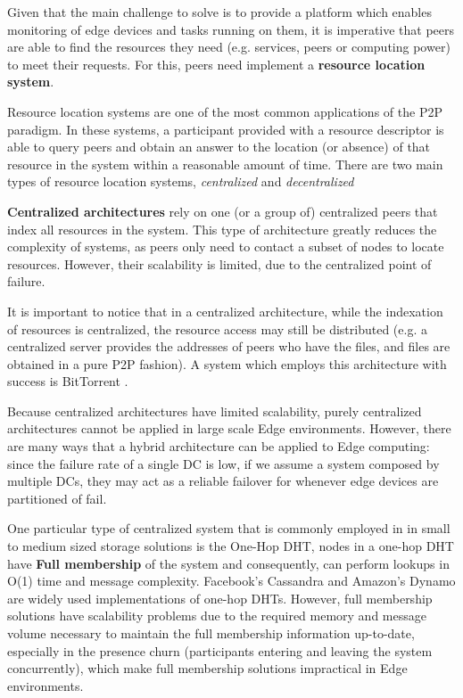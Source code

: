 

Given that the main challenge to solve is to provide a platform which enables monitoring of edge devices and tasks running on them, it is imperative that peers are able to find the resources they need (e.g. services, peers or computing power) to meet their requests. For this, peers need implement a \textbf{resource location system}.

Resource location systems are one of the most common applications of the P2P paradigm. In these systems, a participant provided with a resource descriptor is able to query peers and obtain an answer to the location (or absence) of that resource in the system within a reasonable amount of time. There are two main types of resource location systems, \textit{centralized} and \textit{decentralized}

\textbf{Centralized architectures} rely on one (or a group of) centralized peers that index all resources in the system. This type of architecture greatly reduces the complexity of systems, as peers only need to contact a subset of nodes to locate resources. However, their scalability is limited, due to the centralized point of failure. 

It is important to notice that in a centralized architecture, while the indexation of resources is centralized, the resource access may still be distributed (e.g. a centralized server provides the addresses of peers who have the files, and files are obtained in a pure P2P fashion). A system which employs this architecture with success is BitTorrent \cite{cohen2003incentives}.

Because centralized architectures have limited scalability, purely centralized architectures cannot be applied in large scale Edge environments. However, there are many ways that a hybrid architecture can be applied to Edge computing: since the failure rate of a single DC is low, if we assume a system composed by multiple DCs, they may act as a reliable failover for whenever edge devices are partitioned of fail. 

One particular type of centralized system that is commonly employed in in small to medium sized storage solutions is the One-Hop DHT, nodes in a one-hop DHT have \textbf{Full membership} of the system and consequently, can perform lookups in O(1) time and message complexity. Facebook's Cassandra \cite{lakshman2010cassandra} and Amazon's Dynamo \cite{decandia2007dynamo} are widely used implementations of one-hop DHTs. However, full membership solutions have scalability problems due to the required memory and message volume necessary to maintain the full membership information up-to-date, especially in the presence churn (participants entering and leaving the system concurrently), which make full membership solutions impractical in Edge environments.

